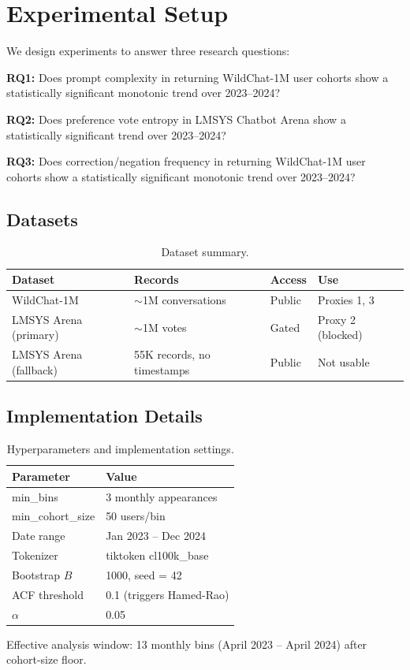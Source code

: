 \section{Experimental Setup}
\label{sec:setup}

We design experiments to answer three research questions:

\textbf{RQ1:} Does prompt complexity in returning WildChat-1M user cohorts show a statistically significant monotonic trend over 2023--2024?

\textbf{RQ2:} Does preference vote entropy in LMSYS Chatbot Arena show a statistically significant trend over 2023--2024?

\textbf{RQ3:} Does correction/negation frequency in returning WildChat-1M user cohorts show a statistically significant monotonic trend over 2023--2024?

\subsection*{Datasets}

\begin{table}[h]
\centering
\caption{Dataset summary.}
\label{tab:datasets}
\begin{tabular}{llll}
\toprule
Dataset & Records & Access & Use \\
\midrule
WildChat-1M & $\sim$1M conversations & Public & Proxies 1, 3 \\
LMSYS Arena (primary) & $\sim$1M votes & Gated & Proxy 2 (blocked) \\
LMSYS Arena (fallback) & 55K records, no timestamps & Public & Not usable \\
\bottomrule
\end{tabular}
\end{table}

\subsection*{Implementation Details}

\begin{table}[h]
\centering
\caption{Hyperparameters and implementation settings.}
\label{tab:params}
\begin{tabular}{ll}
\toprule
Parameter & Value \\
\midrule
min\_bins & 3 monthly appearances \\
min\_cohort\_size & 50 users/bin \\
Date range & Jan 2023 -- Dec 2024 \\
Tokenizer & tiktoken cl100k\_base \\
Bootstrap $B$ & 1000, seed = 42 \\
ACF threshold & 0.1 (triggers Hamed-Rao) \\
$\alpha$ & 0.05 \\
\bottomrule
\end{tabular}
\end{table}

Effective analysis window: 13 monthly bins (April 2023 -- April 2024) after cohort-size floor.
